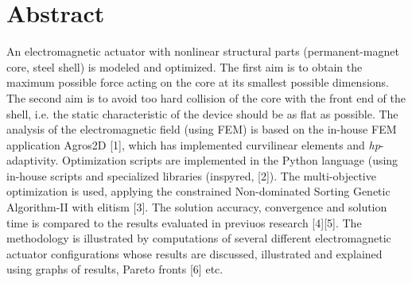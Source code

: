\documentclass[article, A4, 11pt]{llncs}%
\begin{document}
\section*{Abstract}
An electromagnetic actuator with nonlinear structural parts (permanent-magnet core, steel shell) is modeled and optimized. The first aim is to obtain the maximum possible force acting on the core at its smallest possible dimensions. The second aim is to avoid too hard collision of the core with the front end of the shell, i.e. the static characteristic of the device should be as flat as possible. The analysis of the electromagnetic field (using FEM) is based on the in-house FEM application Agros2D [1], which has implemented curvilinear elements and \textit{hp}-adaptivity. Optimization scripts are implemented in the Python language (using in-house scripts and specialized libraries (inspyred, [2]). The multi-objective optimization is used, applying the constrained Non-dominated Sorting Genetic Algorithm-II with elitism [3]. The solution accuracy, convergence and solution time is compared to the results evaluated in previuos research [4][5]. The methodology is illustrated by computations of several different electromagnetic actuator configurations whose results are discussed, illustrated and explained using graphs of results, Pareto fronts [6] etc.
\end{document}
